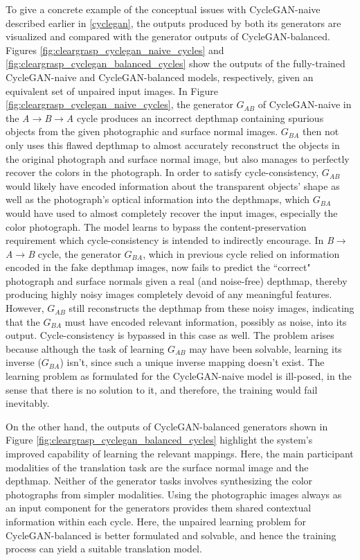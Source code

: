 To give a concrete example of the conceptual issues with CycleGAN-naive described earlier in \ref{cyclegan}, the outputs produced by both its generators are visualized and compared with the generator outputs of CycleGAN-balanced. Figures \ref{fig:cleargrasp_cyclegan_naive_cycles} and \ref{fig:cleargrasp_cyclegan_balanced_cycles} show the outputs of the fully-trained CycleGAN-naive and CycleGAN-balanced models, respectively, given an equivalent set of unpaired input images. In Figure \ref{fig:cleargrasp_cyclegan_naive_cycles}, the generator $G_{AB}$ of CycleGAN-naive in the \textit{A}$\rightarrow$\textit{B}$\rightarrow$\textit{A} cycle produces an incorrect depthmap containing spurious objects from the given photographic and surface normal images. $G_{BA}$ then not only uses this flawed depthmap to almost accurately reconstruct the objects in the original photograph and surface normal image, but also manages to perfectly recover the colors in the photograph. In order to satisfy cycle-consistency, $G_{AB}$ would likely have encoded information about the transparent objects' shape as well as the photograph's optical information into the depthmaps, which $G_{BA}$ would have used to almost completely recover the input images, especially the color photograph. The model learns to bypass the content-preservation requirement which cycle-consistency is intended to indirectly encourage. In \textit{B}$\rightarrow$\textit{A}$\rightarrow$\textit{B} cycle, the generator $G_{BA}$, which in previous cycle relied on information encoded in the fake depthmap images, now fails to predict the ``correct" photograph and surface normals given a real (and noise-free) depthmap, thereby producing highly noisy images completely devoid of any meaningful features. However, $G_{AB}$ still reconstructs the depthmap from these noisy images, indicating that the $G_{BA}$ must have encoded relevant information, possibly as noise, into its output. Cycle-consistency is bypassed in this case as well. The problem arises because although the task of learning $G_{AB}$ may have been solvable, learning its inverse ($G_{BA}$) isn't, since such a unique inverse mapping doesn't exist. The learning problem as formulated for the CycleGAN-naive model is ill-posed, in the sense that there is no solution to it, and therefore, the training would fail inevitably. 

On the other hand, the outputs of CycleGAN-balanced generators shown in Figure \ref{fig:cleargrasp_cyclegan_balanced_cycles} highlight the system's improved capability of learning the relevant mappings. Here, the main participant modalities of the translation task are the surface normal image and the depthmap. Neither of the generator tasks involves synthesizing the color photographs from simpler modalities. Using the photographic images always as an input component for the generators provides them shared contextual information within each cycle. Here, the unpaired learning problem for CycleGAN-balanced is better formulated and solvable, and hence the training process can yield a suitable translation model.




